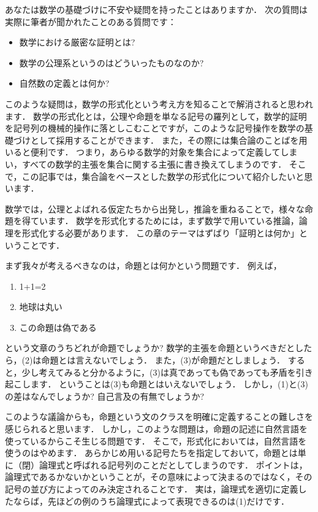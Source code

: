 \documentclass[./main]{subfiles}
\begin{document}
\newcommand{\tbf}{\textbf}
\newcommand{\mbb}{\mathbb}
\newcommand{\mcl}{\mathcal}



あなたは数学の基礎づけに不安や疑問を持ったことはありますか．
次の質問は実際に筆者が聞かれたことのある質問です：
\begin{itemize}
\item 数学における厳密な証明とは?
\item 数学の公理系というのはどういったものなのか?
\item 自然数の定義とは何か?
\end{itemize}
このような疑問は，数学の形式化という考え方を知ることで解消されると思われます．
数学の形式化とは，公理や命題を単なる記号の羅列として，数学的証明を記号列の機械的操作に落としこむことですが，このような記号操作を数学の基礎づけとして採用することができます．
また，その際には集合論のことばを用いると便利です．
つまり，あらゆる数学的対象を集合によって定義してしまい，すべての数学的主張を集合に関する主張に書き換えてしまうのです．
そこで，この記事では，集合論をベースとした数学の形式化について紹介したいと思います．


数学では，公理とよばれる仮定たちから出発し，推論を重ねることで，様々な命題を得ています．
数学を形式化するためには，まず数学で用いている推論，論理を形式化する必要があります．
この章のテーマはずばり「証明とは何か」ということです．


まず我々が考えるべきなのは，命題とは何かという問題です．
例えば，
\begin{enumerate}
\item 1+1=2
\item 地球は丸い
\item この命題は偽である
\end{enumerate}
という文章のうちどれが命題でしょうか?
数学的主張を命題というべきだとしたら，(2)は命題とは言えないでしょう．
また，(3)が命題だとしましょう．
すると，少し考えてみると分かるように，(3)は真であっても偽であっても矛盾を引き起こします．
ということは(3)も命題とはいえないでしょう．
しかし，(1)と(3)の差はなんでしょうか?
自己言及の有無でしょうか?

このような議論からも，命題という文のクラスを明確に定義することの難しさを感じられると思います．
しかし，このような問題は，命題の記述に自然言語を使っているからこそ生じる問題です．
そこで，形式化においては，自然言語を使うのはやめます．
あらかじめ用いる記号たちを指定しておいて，命題とは単に（閉）論理式と呼ばれる記号列のことだとしてしまうのです．
ポイントは，論理式であるかないかということが，その意味によって決まるのではなく，その記号の並び方によってのみ決定されることです．
実は，論理式を適切に定義したならば，先ほどの例のうち論理式によって表現できるのは(1)だけです．
\end{document}
